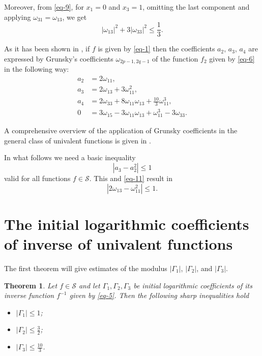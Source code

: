 \documentclass{amsart}
\newtheorem{thm}{Theorem}
\begin{document}
Moreover, from \eqref{eq-9}, for $x_{1}=0$ and  $x_{3}=1 $, omitting the last component and applying $\omega_{31}=\omega_{13}$, we get
\begin{equation}\label{eq-10a}
|\omega_{13}|^{2}+3|\omega_{33}|^{2}\leq\frac13.
\end{equation}

As it has been shown in \cite[p. 57]{Lebedev}, if $f$ is given by \eqref{eq-1} then the coefficients $a_{2}$, $ a_{3}$, $ a_{4}$  are expressed by Grunsky's coefficients  $\omega_{2p-1,2q-1}$ of the function $f_{2}$ given by
\eqref{eq-6} in the following way:
\begin{equation}\label{eq-11}
\begin{split}
a_{2}&=2\omega _{11},\\
a_{3}&=2\omega_{13}+3\omega_{11}^{2}, \\
a_{4}&=2\omega_{33}+8\omega_{11}\omega_{13}+\frac{10}{3}\omega_{11}^{3},\\
0&=3\omega_{15}-3\omega_{11}\omega_{13}+\omega_{11}^{3}-3\omega_{33}.
\end{split}
\end{equation}

\medskip

A comprehensive overview of the application of Grunsky coefficients in the general class of univalent functions is given in \cite{128}.

\medskip

In what follows we need a basic inequality
\begin{equation}\label{eq-99}
|a_{3}-a_{2}^{2}|\leq1
\end{equation}
valid for all functions $f\in\mathcal{S}$. This and \eqref{eq-11} result in
\begin{equation}\label{eq-100}
|2\omega_{13}-\omega_{11}^{2}|\leq1.
\end{equation}


\medskip


\section{The initial  logarithmic coefficients of inverse of univalent functions}

\medskip

The first theorem will give estimates of the modulus $|\Gamma_{1}|$, $|\Gamma_{2}|$, and $|\Gamma_{3}|.$

\medskip

\begin{thm}\label{th1}
Let $f\in\mathcal{S}$ and let $\Gamma_{1},\Gamma_{2},\Gamma_{3}$ be initial logarithmic coefficients of
its inverse function $f^{-1}$ given by \eqref{eq-5}. Then the following sharp inequalities hold
\begin{itemize}
  \item[($i$)] $|\Gamma_{1}|\leq 1$;
  \item[($ii$)] $|\Gamma_{2}| \leq\frac{3}{2}$;
  \item [($iii$)]$|\Gamma_{3}|\leq\frac{10}{3}$.
\end{itemize}
\end{thm}
\end{document}
